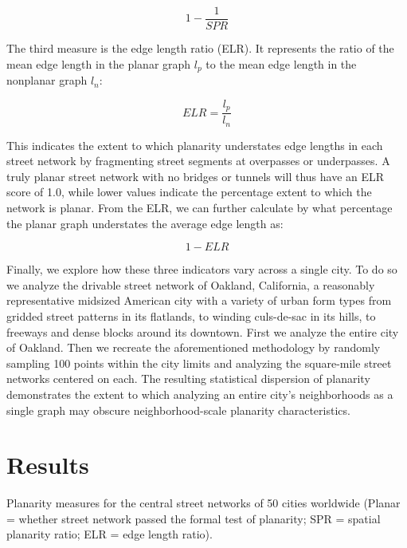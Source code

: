 \documentclass[Afour,sageh,times]{sagej}
\begin{document}
\begin{equation}
	\label{eq:spr_overstates}
	1 - \frac{1}{SPR}
\end{equation}

The third measure is the edge length ratio (ELR). It represents the ratio of the mean edge length in the planar graph $l_p$ to the mean edge length in the nonplanar graph $l_n$:

\begin{equation}
	\label{eq:elr}
	ELR = \frac{l_p}{l_n}
\end{equation}

This indicates the extent to which planarity understates edge lengths in each street network by fragmenting street segments at overpasses or underpasses. A truly planar street network with no bridges or tunnels will thus have an ELR score of 1.0, while lower values indicate the percentage extent to which the network is planar. From the ELR, we can further calculate by what percentage the planar graph understates the average edge length as:

\begin{equation}
	\label{eq:elr_understates}
	1 - ELR
\end{equation}

Finally, we explore how these three indicators vary across a single city. To do so we analyze the drivable street network of Oakland, California, a reasonably representative midsized American city with a variety of urban form types from gridded street patterns in its flatlands, to winding culs-de-sac in its hills, to freeways and dense blocks around its downtown. First we analyze the entire city of Oakland. Then we recreate the aforementioned methodology by randomly sampling 100 points within the city limits and analyzing the square-mile street networks centered on each. The resulting statistical dispersion of planarity demonstrates the extent to which analyzing an entire city's neighborhoods as a single graph may obscure neighborhood-scale planarity characteristics.



\section{Results}

\begin{table}[htbp]
	\centering
	\caption{Planarity measures for the central street networks of 50 cities worldwide (Planar = whether street network passed the formal test of planarity; SPR = spatial planarity ratio; ELR = edge length ratio).}
	\label{tab:world_cities}
	
\end{table}
\end{document}
